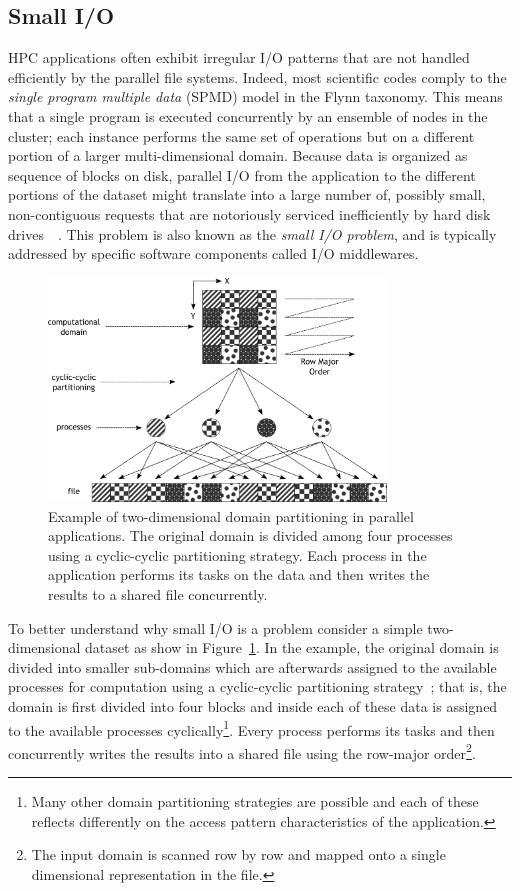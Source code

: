 \subsection{Small I/O}
HPC applications often exhibit irregular I/O patterns that are not handled efficiently by the parallel file systems. Indeed, most scientific codes comply to the \textit{single program multiple data} (SPMD) model 
in the Flynn taxonomy. This means that a single program is executed concurrently by an ensemble of nodes in the cluster; each instance performs the same set of operations but on a different portion of a larger 
multi-dimensional domain. Because data is organized as sequence of blocks on disk, parallel I/O from the application to the different portions of the dataset might translate into a large number of, possibly small, 
non-contiguous requests that are notoriously serviced inefficiently by hard disk drives~\cite{Nieuwejaar1996}~\cite{Simitci1998}. This problem is also known as the \textit{small I/O problem}, and is typically 
addressed by specific software components called I/O middlewares. 

\begin{figure}[!htb]
\centering
\includegraphics[width=0.8\textwidth]{figures/small-io}
\caption{Example of two-dimensional domain partitioning in parallel applications. The original domain is divided among four processes using a cyclic-cyclic partitioning strategy. Each process in the application 
performs its tasks on the data and then writes the results to a shared file concurrently.}
\label{figure: small-io}
\end{figure}

To better understand why small I/O is a problem consider a simple two-dimensional dataset as show in Figure~\ref{figure: small-io}. In the example, the original domain is divided into smaller sub-domains which are afterwards 
assigned to the available processes for computation using a cyclic-cyclic partitioning strategy~\cite{delRosario1993}; that is, the domain is first divided into four blocks and inside each of these data is assigned to the available processes 
cyclically\footnote{Many other domain partitioning strategies are possible and each of these reflects differently on the access pattern characteristics of the application.}. Every process performs its tasks and then concurrently 
writes the results into a shared file using the row-major order\footnote{The input domain is scanned row by row and mapped onto a single dimensional representation in the file.}.

